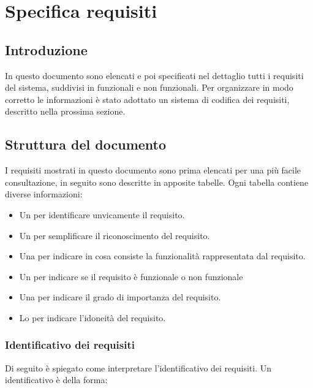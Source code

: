 \chapter{Specifica requisiti} 
\label{cha:specifica_requisiti}

\section{Introduzione} 
In questo documento sono elencati e poi specificati nel dettaglio tutti i requisiti del sistema, suddivisi in funzionali e non funzionali.
Per organizzare in modo corretto le informazioni è stato adottato un sistema di codifica dei requisiti, descritto nella prossima sezione.

\section{Struttura del documento}
\label{sec:struttura_del_documento}

I requisiti mostrati in questo documento sono prima elencati per una più facile consultazione, in seguito sono descritte in apposite tabelle. 
Ogni tabella contiene diverse informazioni:
\begin{itemize}
	\item Un  per identificare unvicamente il requisito.
	\item Un  per semplificare il riconoscimento del requisito.
	\item Una  per indicare in cosa consiste la funzionalità rappresentata dal requisito.
	\item Un  per indicare se il requisito è funzionale o non funzionale
	\item Una  per indicare il grado di importanza del requisito.
	\item Lo  per indicare l'idoneità del requisito.
\end{itemize}

\subsection{Identificativo dei requisiti}
\label{subsec:identificativo_dei_requisiti}

Di seguito è spiegato come interpretare l'identificativo dei requisiti.
Un identificativo è della forma:
\begin{center}
\end{center}


